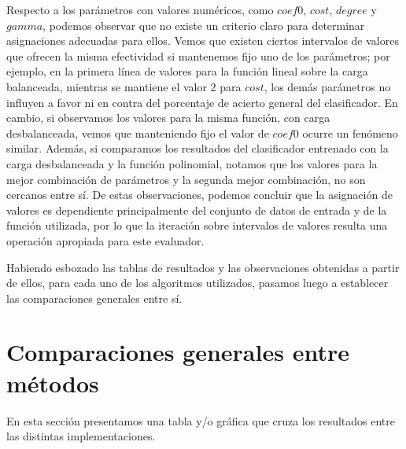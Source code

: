 
Respecto a los par\'ametros con valores num\'ericos, como $coef0$, $cost$, $degree$ y $gamma$, podemos observar que no existe un criterio claro para determinar asignaciones adecuadas para ellos. Vemos que existen ciertos intervalos de valores que ofrecen la misma efectividad si mantenemos fijo uno de los par\'ametros; por ejemplo, en la primera l\'inea de valores para la funci\'on lineal sobre la carga balanceada, mientras se mantiene el valor 2 para $cost$, los dem\'as par\'ametros no influyen a favor ni en contra del porcentaje de acierto general del clasificador. En cambio, si observamos los valores para la misma funci\'on, con carga desbalanceada, vemos que manteniendo fijo el valor de $coef0$ ocurre un fen\'omeno similar. Adem\'as, si comparamos los resultados del clasificador entrenado con la carga desbalanceada y la funci\'on polinomial, notamos que los valores para la mejor combinaci\'on de par\'ametros y la segunda mejor combinaci\'on, no son cercanos entre s\'i. De estas observaciones, podemos concluir que la asignaci\'on de valores es dependiente principalmente del conjunto de datos de entrada y de la funci\'on utilizada, por lo que la iteraci\'on sobre intervalos de valores resulta una operaci\'on apropiada para este evaluador.
\newline

Habiendo esbozado las tablas de resultados y las observaciones obtenidas a partir de ellos, para cada uno de los algoritmos utilizados, pasamos luego a establecer las comparaciones generales entre s\'i.

\section{Comparaciones generales entre m\'etodos}

En esta secci\'on presentamos una tabla y/o gr\'afica que cruza los resultados entre las distintas implementaciones.